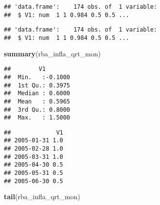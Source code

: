 \documentclass[]{article}
\newenvironment{Shaded}{\begin{snugshade}}{\end{snugshade}}
\newcommand{\KeywordTok}[1]{\textcolor[rgb]{0.13,0.29,0.53}{\textbf{#1}}}
\newcommand{\DecValTok}[1]{\textcolor[rgb]{0.00,0.00,0.81}{#1}}
\newcommand{\StringTok}[1]{\textcolor[rgb]{0.31,0.60,0.02}{#1}}
\newcommand{\OperatorTok}[1]{\textcolor[rgb]{0.81,0.36,0.00}{\textbf{#1}}}
\newcommand{\NormalTok}[1]{#1}
\begin{document}
\begin{verbatim}
## 'data.frame':    174 obs. of  1 variable:
##  $ V1: num  1 1 0.984 0.5 0.5 ...
\end{verbatim}

\begin{Shaded}
\end{Shaded}

\begin{verbatim}
## 'data.frame':    174 obs. of  1 variable:
##  $ V1: num  1 1 0.984 0.5 0.5 ...
\end{verbatim}

\begin{Shaded}
\begin{Highlighting}[]
      \KeywordTok{summary}\NormalTok{(rba_infla_qrt_mon)}
\end{Highlighting}
\end{Shaded}

\begin{verbatim}
##        V1         
##  Min.   :-0.1000  
##  1st Qu.: 0.3975  
##  Median : 0.6000  
##  Mean   : 0.5965  
##  3rd Qu.: 0.8000  
##  Max.   : 1.5000
\end{verbatim}

\begin{Shaded}
\end{Shaded}

\begin{verbatim}
##             V1
## 2005-01-31 1.0
## 2005-02-28 1.0
## 2005-03-31 1.0
## 2005-04-30 0.5
## 2005-05-31 0.5
## 2005-06-30 0.5
\end{verbatim}

\begin{Shaded}
\begin{Highlighting}[]
      \KeywordTok{tail}\NormalTok{(rba_infla_qrt_mon)}
\end{Highlighting}
\end{Shaded}
\end{document}
